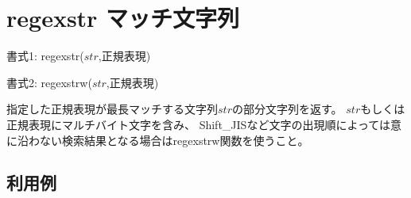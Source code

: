
%

\section{regexstr マッチ文字列\label{sect:regexstr}}

書式1: regexstr($str$,正規表現)

書式2: regexstrw($str$,正規表現)

指定した正規表現が最長マッチする文字列$str$の部分文字列を返す。
$str$もしくは正規表現にマルチバイト文字を含み、
Shift\_JISなど文字の出現順によっては意に沿わない検索結果となる場合はregexstrw関数を使うこと。

\subsection*{利用例}


%

